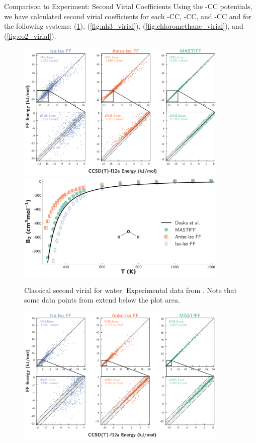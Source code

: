 \begin{subsection}{Comparison to Experiment: Second Virial Coefficients}
Using the -CC potentials, we have calculated second virial coefficients for each \isoff-CC, \isaff-CC, and
\mastiff-CC and for the following systems:
\ho (\cref{fig:h2o_virial}), 
\nh (\cref{fig:nh3_virial}), 
\cl (\cref{fig:chloromethane_virial}), and
\co (\cref{fig:co2_virial}).
%
%
    \begin{figure}[ht]
    \centering
    \includegraphics[width=0.9\textwidth]{anisotropic/scatterplots/h2o_h2o_comparison.pdf}
    \includegraphics[width=0.9\textwidth]{anisotropic/virials/h2o/h2o_2nd_virial.pdf}
    \caption{
        Classical second virial for water. Experimental data from
            . 
        Note that some data points from \isoff extend below the plot area.
            }
    \label{fig:h2o_virial}
    \end{figure}
    \begin{figure}[ht]
    \centering
    \includegraphics[width=0.9\textwidth]{anisotropic/scatterplots/nh3_nh3_comparison.pdf}

\end{figure}
\end{subsection}
